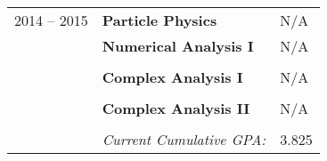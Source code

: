 \documentclass[15pt]{tccv}
\begin{document}
\begin{tabular}{rl|l}
2014 -- 2015 & \textbf{Particle Physics} & \textsc{N/A} \\
             & \textbf{Numerical Analysis I} & \textsc{N/A} \\ \\
             
             & \textbf{Complex Analysis I} & \textsc{N/A} \\ \\
             
             & \textbf{Complex Analysis II} & \textsc{N/A} \\ \\
        
             
             & \textit{Current Cumulative GPA:} & \textsc{3.825}
             

\end{tabular}\\[10pt]
\end{document}

